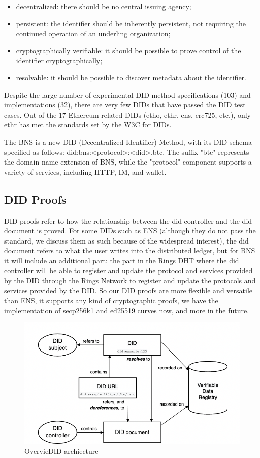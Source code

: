 \documentclass[twocolumn]{article}
\begin{document}
\begin{itemize}[itemsep=2pt,topsep=0pt,parsep=0pt]
\item    decentralized: there should be no central issuing agency;
\item    persistent: the identifier should be inherently persistent, not requiring the continued operation of an underling organization;
\item    cryptographically verifiable: it should be possible to prove control of the identifier cryptographically;
\item    resolvable: it should be possible to discover metadata about the identifier.
\end{itemize}

Despite the large number of experimental DID method specifications (103) and implementations (32)\cite{W3C-DID-Use-Cases}, there are very few DIDs that have passed the DID test cases. Out of the 17 Ethereum-related DIDs (etho, ethr, ens, erc725, etc.), only ethr has met the standards set by the W3C for DIDs.

The BNS is a new DID (Decentralized Identifier) Method, with its DID schema specified as follows: did:bns:<protocol>:<did>.btc. The suffix "btc" represents the domain name extension of BNS, while the "protocol" component supports a variety of services, including HTTP, IM, and wallet.

\subsection{DID Proofs}
DID proofs refer to how the relationship between the did controller and the did document is proved. For some DIDs such as ENS (although they do not pass the standard, we discuss them as such because of the widespread interest), the did document refers to what the user writes into the distributed ledger, but for BNS it will include an additional part: the part in the Rings DHT where the did controller will be able to register and update the protocol and services provided by the DID through the Rings Network to register and update the protocols and services provided by the DID. So our DID proofs are more flexible and versatile than ENS, it supports any kind of cryptographic proofs, we have the implementation of secp256k1 and ed25519 curves now, and more in the future.

\begin{figure}[H]
  \label{arch}
  \includegraphics[width=\linewidth]{imgs/arch.png}
  \caption{OvervieDID archiecture}
\end{figure}
\end{document}
